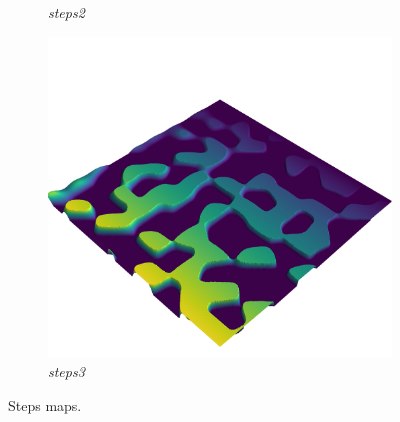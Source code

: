\documentclass[../document.tex]{subfiles}
\begin{document}
\begin{figure}[H]
\begin{subfigure}[b]{0.32\linewidth}
            \caption{\emph{steps2}}
            \end{subfigure}    
          \begin{subfigure}[b]{0.32\textwidth}
            \includegraphics[width=\textwidth]{../img/hm3d/steps3.png}
            \caption{\emph{steps3}}
        \end{subfigure}    
    \label{fig: heightmaps}
    \caption{Steps maps.}
\end{figure}
\end{document}
